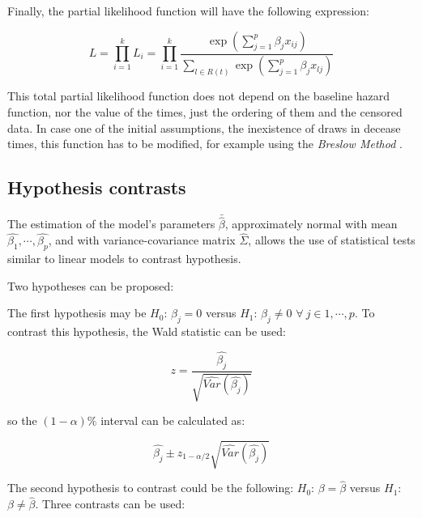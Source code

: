 \documentclass[11pt]{book} %
\begin{document}
      Finally, the partial likelihood function will have the following expression:

      \begin{equation}
        L = \prod_{i=1}^k L_i= \prod_{i=1}^k \frac{\exp\left(\sum_{j=1}^p\beta_jx_{ij}\right)}{\sum_{l\in R(t)}\exp\left(\sum_{j=1}^p\beta_jx_{lj}\right)}
        \label{eq:cox-total-partial-likelihood-function}
      \end{equation}

      This total partial likelihood function does not depend on the baseline hazard function, nor the value of the times, just the ordering of them and the censored data. In case one of the initial assumptions, the inexistence of draws in decease times, this function has to be modified, for example using the \emph{Breslow Method} \cite{breslow-method}.

    \subsection{Hypothesis contrasts}

      The estimation of the model's parameters $\bar{\widehat{\beta}}$, approximately normal with mean ${\widehat{\beta_1},\cdots,\widehat{\beta_p}}$, and with variance-covariance matrix $\widehat{\Sigma}$, allows the use of statistical tests similar to linear models to contrast hypothesis.

      Two hypotheses can be proposed:

      The first hypothesis may be $H_0$: $\beta_j=0$ versus $H_1$: $\beta_j\neq0$ $\forall \ j \in {1,\cdots,p}$. To contrast this hypothesis, the Wald statistic can be used:

      \begin{equation}
        z=\frac{\widehat{\beta_j}}{\sqrt{\widehat{Var}(\widehat{\beta_j})}}
        \label{eq:cox-hyp-contrast-1-wald}
      \end{equation}

      so the $(1-\alpha)\%$ interval can be calculated as:

      \begin{equation}
        \widehat{\beta_j}\pm z_{1-\alpha/2}\sqrt{\widehat{Var}(\widehat{\beta_j})}
        \label{eq:cox-hyp-contrast-1-wald-interval}
      \end{equation}

      The second hypothesis to contrast could be the following: $H_0$: $\beta=\widehat{\beta}$ versus $H_1$: $\beta\neq\widehat{\beta}$. Three contrasts can be used:
\end{document}
